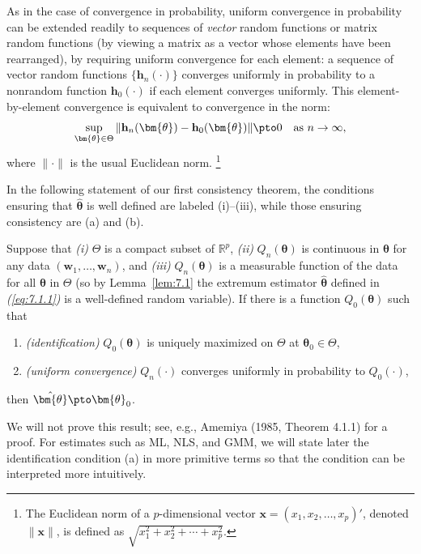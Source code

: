 As in the case of convergence in probability, uniform convergence in probability can be extended readily to sequences of \emph{vector} random functions or matrix random functions (by viewing a matrix as a vector whose elements have been rearranged), by requiring uniform convergence for each element: a sequence of vector random functions $\{\mathbf{h}_n(\cdot)\}$ converges uniformly in probability to a nonrandom function $\mathbf{h}_0(\cdot)$ if each element converges uniformly. This element-by-element convergence is equivalent to convergence in the norm:
\begin{equation}
\label{eq:7.2.2}
\sup_{\bm{\theta} \in \Theta} \| \mathbf{h}_n(\bm{\theta}) - \mathbf{h}_0(\bm{\theta}) \| \pto 0 \quad \text{as } n \to \infty,
\end{equation}
where $\| \cdot \|$ is the usual Euclidean norm.%
\footnote{The Euclidean norm of a $p$-dimensional vector $\mathbf{x} = (x_1, x_2, \ldots, x_p)'$, denoted $\|\mathbf{x}\|$, is defined as $\sqrt{x_1^2 + x_2^2 + \cdots + x_p^2}$.}

In the following statement of our first consistency theorem, the conditions ensuring that $\hat{\bm{\theta}}$ is well defined are labeled (i)--(iii), while those ensuring consistency are (a) and (b).

\begin{proposition}
\label{prop:7.1}
Suppose that \emph{(i)} $\Theta$ is a compact subset of $\mathbb{R}^p$, \emph{(ii)} $Q_n(\bm{\theta})$ is continuous in $\bm{\theta}$ for any data $(\mathbf{w}_1, \ldots, \mathbf{w}_n)$, and \emph{(iii)} $Q_n(\bm{\theta})$ is a measurable function of the data for all $\bm{\theta}$ in $\Theta$ (so by Lemma~\ref{lem:7.1} the extremum estimator $\hat{\bm{\theta}}$ defined in \emph{(\ref{eq:7.1.1})} is a well-defined random variable). If there is a function $Q_0(\bm{\theta})$ such that
\begin{enumerate}[label=(\alph*)]
\item \emph{(identification)} \enspace $Q_0(\bm{\theta})$ is uniquely maximized on $\Theta$ at $\bm{\theta}_0 \in \Theta$,
\item \emph{(uniform convergence)} \enspace $Q_n(\cdot)$ converges uniformly in probability to $Q_0(\cdot)$,
\end{enumerate}
then $\hat{\bm{\theta}} \pto \bm{\theta}_0$.
\end{proposition}

We will not prove this result; see, e.g., Amemiya (1985, Theorem 4.1.1) for a proof. For estimates such as ML, NLS, and GMM, we will state later the identification condition (a) in more primitive terms so that the condition can be interpreted more intuitively.

